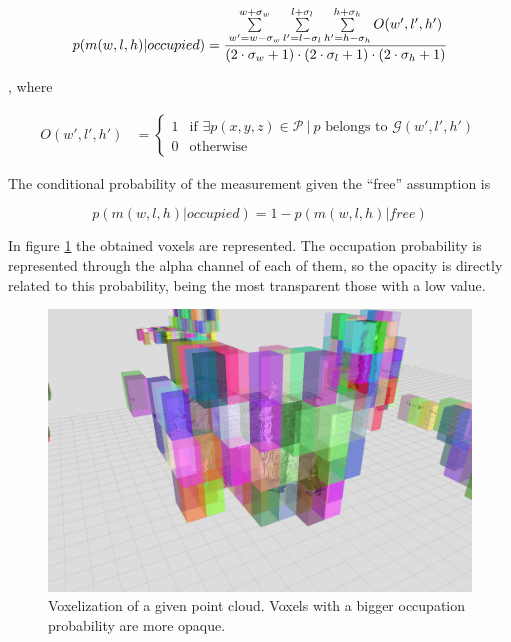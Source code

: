 \begin{equation}\label{eq:cp05_conditional_prob}
p(m(w,l,h)|occupied) = {
{\sum \limits_{w'=w-\sigma_w}^{w+\sigma_w} \sum \limits_{l'=l-\sigma_l}^{l+\sigma_l} \sum \limits_{h'=h-\sigma_h}^{h+\sigma_h} O(w',l',h')} 
\over 
{(2 \cdot \sigma_w + 1) \cdot (2 \cdot \sigma_l + 1) \cdot (2 \cdot \sigma_h + 1)}}
\end{equation}

, where

\begin{equation}\label{eq:cp05_occupied}
\begin{align*}
 O(w', l', h') &=
  \begin{cases}
   1        & \text{if } %
   {\exists p(x, y, z) \in \mathcal{P} ~|~ p \text{ belongs to } \mathcal{G}(w', l', h')}%
   \\
   0        & \text{otherwise}
  \end{cases}
\end{align*}
\end{equation}

The conditional probability of the measurement given the “free” assumption is

\begin{equation}\label{eq:cp05_conditional_prob}
p(m(w,l,h)|occupied) = 1 - p(m(w,l,h)|free)
\end{equation}

In figure \ref{fig:cp05_voxelization} the obtained voxels are represented. The occupation probability is represented through the alpha channel of each of them, so the opacity is directly related to this probability, being the most transparent those with a low value.

\begin{figure}[t]
  \centering
  \includegraphics{voxelization}
  \caption{Voxelization of a given point cloud. Voxels with a bigger occupation probability are more opaque.}\label{fig:cp05_voxelization}
\end{figure}

